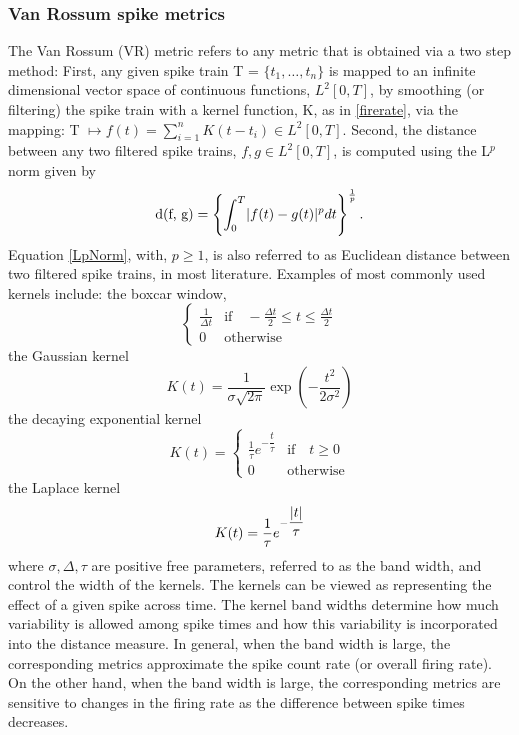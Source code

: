 \subsubsection{Van Rossum spike metrics}
The Van Rossum (VR) metric \cite{Rossum2001,houghton2010measuring} refers to any metric that is obtained via a two step method:
First, any given spike train T = $\{t_{1}, \ldots, t_{n} \}$ is mapped to an infinite dimensional vector space of continuous functions, $L^{2}[0, T]$, by smoothing (or filtering) the spike train with a kernel function, K, as in \eqref{firerate}, via the mapping:
T $\displaystyle \mapsto f(t) = \sum_{i=1}^{n} K(t-t_{i}) \in L^{2}[0, T].$
Second, the distance between any two filtered spike trains, $f, g \in L^{2}[0,T]$, is computed using the L$^{p}$ norm given by
\begin{equation}\label{LpNorm}
\text{d(f, g)} = 
\displaystyle \left \{ \int_{0}^{T} \lvert f(t) - g(t)\rvert^{p} dt 
\right \}^{\frac{1}{p}}.
\end{equation}
Equation \eqref{LpNorm}, with, $p \geq 1$, is also referred to as Euclidean
distance between two filtered spike trains, in most literature.
Examples of most commonly used kernels include:
the boxcar window,
\[   
\begin{cases} 
    \frac{1}{\Delta t} & \text{if} \quad  -\frac{\Delta t}{2} \leq t \leq \frac{\Delta t}{2} \\
0 & \text{otherwise}        
\end{cases}
\]
the Gaussian kernel
\[
K(t) = \frac{1}{\sigma \sqrt{2\pi}} \exp(-\dfrac{t^{2}}{2\sigma^2})
\]
the decaying exponential kernel
\[
K(t) = \begin{cases} 
    \frac{1}{\tau}e^{-\dfrac{t}{\tau}} & \text{if} \quad t \geq 0  \\
0 & \text{otherwise}        
\end{cases}
\]
the Laplace kernel
\[
K(t) = \frac{1}{\tau}e^{-\dfrac{\lvert t\rvert}{\tau}}  
\]
where $\sigma, \Delta, \tau$ are positive free parameters, referred to as the band width, and control the width of the kernels.
The kernels can be viewed as representing the effect of a given spike across time. The kernel band widths determine how much variability is allowed among spike times and how this variability is incorporated into the distance measure.
In general, when the band width is large, the corresponding metrics approximate
the spike count rate (or overall firing rate). On the other hand, when the band width is large, the corresponding metrics are sensitive to changes in the firing rate as the difference between spike times decreases.





